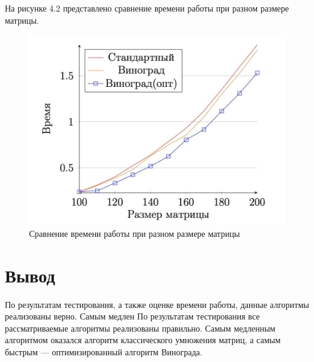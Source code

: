 \documentclass[12pt]{report}
\begin{document}
На рисунке 4.2 представлено сравнение времени работы при разном размере матрицы.
\begin{figure}[H]
    \centering
    \includegraphics[width=0.70\linewidth]{6.jpg}
    \caption{Сравнение времени работы при разном размере матрицы}
    \label{fig:mpr}
\end{figure}
\newline
\newpage



\section{Вывод}
По результатам тестирования, а также оценке времени работы, данные алгоритмы реализованы верно. Самым медлен
По результатам тестирования все рассматриваемые алгоритмы реализованы правильно. Самым медленным алгоритмом оказался алгоритм классического умножения матриц, а самым быстрым — оптимизированный алгоритм Винограда.

\newpage
{}
\nocite{*}
 
\end{document}
